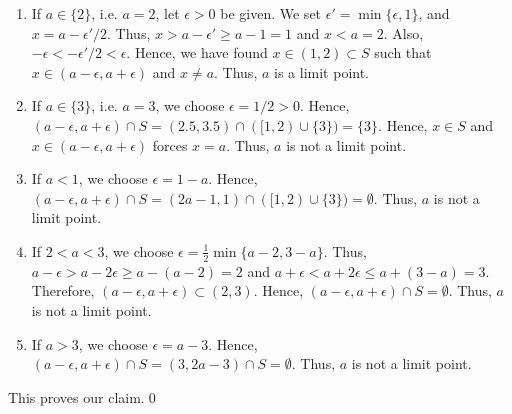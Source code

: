 \documentclass[10pt]{article}
\begin{document}
\begin{enumerate}
\begin{enumerate}
                        \item If $a \in \{2\}$, i.e. $a = 2$, let $\epsilon > 0$ be given. We set $\epsilon' = \min\{\epsilon, 1\}$, and
                        $x = a - \epsilon'/2$. Thus, $x > a - \epsilon' \ge a - 1 = 1$ and $x < a = 2$.
                        Also, $-\epsilon < -\epsilon'/2 < \epsilon$.
                        Hence, we have found $x \in (1, 2) \subset S$ such that $x \in (a - \epsilon, a + \epsilon)$ and
                        $x \neq a$. Thus, $a$ is a limit point.

                        \item If $a \in \{3\}$, i.e. $a = 3$, we choose $\epsilon = 1 /2 > 0$. Hence,
                        $(a - \epsilon, a + \epsilon) \cap S = (2.5, 3.5) \cap ([1, 2) \cup \{3\}) = \{3\}$.
                        Hence, $x \in S$ and $x \in (a - \epsilon, a + \epsilon)$ forces $x = a$.
                        Thus, $a$ is not a limit point.

                        \item If $a < 1$, we choose $\epsilon = 1 - a$. Hence, $(a - \epsilon, a + \epsilon) \cap S =
                        (2a - 1, 1) \cap ([1, 2) \cup \{3\}) = \emptyset$. Thus, $a$ is not a limit point.

                        \item If $2 < a < 3$, we choose $\epsilon = \frac{1}{2}\min\{a-2, 3-a\}$. Thus,
                        $a - \epsilon > a - 2\epsilon \ge a - (a - 2) = 2$ and $a + \epsilon < a + 2\epsilon \le a + (3 - a) = 3$.
                        Therefore, $(a - \epsilon, a + \epsilon) \subset (2, 3)$.
                        Hence, $(a - \epsilon, a + \epsilon) \cap S = \emptyset$.
                        Thus, $a$ is not a limit point.

                        \item If $a > 3$, we choose $\epsilon = a - 3$. Hence, $(a - \epsilon, a + \epsilon) \cap S =
                        (3, 2a - 3) \cap S = \emptyset$.
                        Thus, $a$ is not a limit point.
                \end{enumerate}
                This proves our claim.\qed


\end{enumerate}
\end{document}
